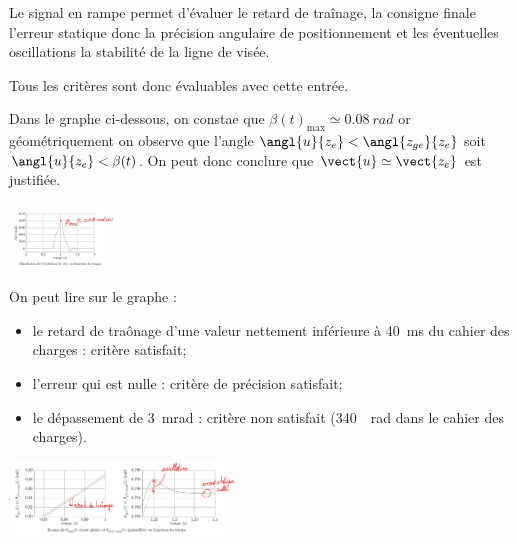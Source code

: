 \question{}
\ifprof
\begin{corrige}
Le signal en rampe permet d'évaluer le retard de traînage, la consigne finale l'erreur statique donc la
précision angulaire de positionnement et les éventuelles oscillations la stabilité de la ligne de visée.

Tous les critères sont donc évaluables avec cette entrée. 

\end{corrige}
\else
\fi


\question{}
\ifprof
\begin{corrige}
Dans le graphe ci-dessous, on constae que $\beta(t)_{\text{max}} \simeq \SI{0,08}{rad}$ or géométriquement on observe que l'angle $\angl{{u}}{{z_e}} <\angl{{z_{ge}}}{{z_e}}$
soit $\angl{{u}}{{z_e}}<\beta(t)$. On peut donc conclure que $\vect{u}\simeq \vect{z_e}$ est justifiée.

\begin{center}
\includegraphics[width=3cm]{images/cor_24_01}
\end{center}
On peut lire sur le graphe : 
\begin{itemize}
\item le retard de traônage d'une valeur nettement inférieure à \SI{40}{ms} du cahier des charges : critère satisfait;
\item l'erreur qui est nulle : critère de précision satisfait;
\item le dépassement de \SI{3}{mrad} : critère non satisfait (\SI{340}{\mu rad} dans le cahier des charges). 
\end{itemize}
\begin{center}
\includegraphics[width=6cm]{images/cor_24_02}
\end{center}

\end{corrige}
\else
\fi

%
%
